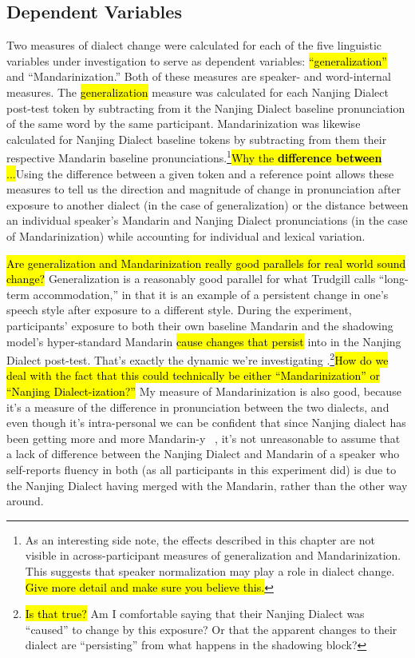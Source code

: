 \subsection{Dependent Variables}
Two measures of dialect change were calculated for each of the five linguistic variables under investigation to serve as dependent variables: \hl{``generalization''} and ``Mandarinization.'' Both of these measures are speaker- and word-internal measures. The \hl{generalization} measure was calculated for each Nanjing Dialect post-test token by subtracting from it the Nanjing Dialect baseline pronunciation of the same word by the same participant. Mandarinization was likewise calculated for Nanjing Dialect baseline tokens by subtracting from them their respective Mandarin baseline pronunciations.\footnote{As an interesting side note, the effects described in this chapter are not visible in across-participant measures of generalization and Mandarinization. This suggests that speaker normalization may play a role in dialect change. \hl{Give more detail and make sure you believe this.}}\hl{Why the \textbf{difference between} ...}Using the difference between a given token and a reference point allows these measures to tell us the direction and magnitude of change in pronunciation after exposure to another dialect (in the case of generalization) or the distance between an individual speaker's Mandarin and Nanjing Dialect pronunciations (in the case of Mandarinization) while accounting for individual and lexical variation.%

\hl{Are generalization and Mandarinization really good parallels for real world sound change?} Generalization is a reasonably good parallel for what Trudgill \citeyearpar{trudgill1986dialects} calls ``long-term accommodation,'' in that it is an example of a persistent change in one's speech style after exposure to a different style. During the experiment, participants' exposure to both their own baseline Mandarin and the shadowing model's hyper-standard Mandarin \hl{cause changes that persist} into in the Nanjing Dialect post-test. That's exactly the dynamic we're investigating \IRL.\footnote{\hl{Is that true?} Am I comfortable saying that their Nanjing Dialect was ``caused'' to change by this exposure? Or that the apparent changes to their dialect are ``persisting'' from what happens in the shadowing block?}\hl{How do we deal with the fact that this could technically be either ``Mandarinization'' or ``Nanjing Dialect-ization?''} My measure of Mandarinization is also good, because it's a measure of the difference in pronunciation between the two dialects, and even though it's intra-personal we can be confident that since Nanjing dialect has been getting more and more Mandarin-y \IRL~\citep{bao1980sixty}, it's not unreasonable to assume that a lack of difference between the Nanjing Dialect and Mandarin of a speaker who self-reports fluency in both (as all participants in this experiment did) is due to the Nanjing Dialect having merged with the Mandarin, rather than the other way around.

